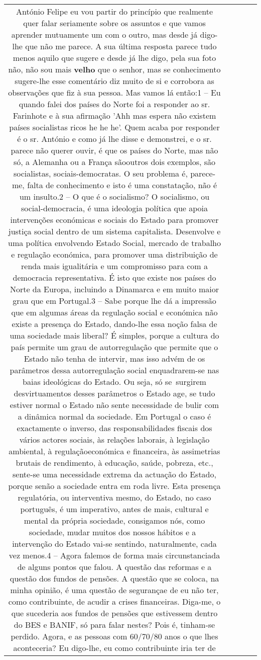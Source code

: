 \documentclass[11pt]{article}
\newlength\mylength
\begin{document}
\begin{center}
\begin{longtable}{|C{.65\mylength}|C{.30\mylength}|C{.12\mylength}|C{.12\mylength}|C{.12\mylength}|}
  \small António Felipe eu vou partir do princípio que realmente quer falar seriamente sobre os assuntos e que vamos aprender mutuamente um com o outro, mas desde já digo-lhe que não me parece. A sua última resposta parece tudo menos aquilo que sugere e desde já lhe digo, pela sua foto não, não sou mais \textbf{velho} que o senhor, mas se conhecimento sugere-lhe esse comentário diz muito de si e corrobora as observações que fiz à sua pessoa. Mas vamos lá então:1 – Eu quando falei dos países do Norte foi a responder ao sr. Farinhote e à sua afirmação 'Ahh mas espera não existem países socialistas ricos he he he'. Quem acaba por responder é o sr. António e como já lhe disse e demonstrei, e o sr. parece não querer ouvir, é que os países do Norte, mas não só, a Alemanha ou a França sãooutros dois exemplos, são socialistas, sociais-democratas. O seu problema é, parece-me, falta de conhecimento e isto é uma constatação, não é um insulto.2 – O que é o socialismo? O socialismo, ou social-democracia, é uma ideologia política que apoia intervenções económicas e sociais do Estado para promover justiça social dentro de um sistema capitalista. Desenvolve e uma política envolvendo Estado Social, mercado de trabalho e regulação económica, para promover uma distribuição de renda mais igualitária e um compromisso para com a democracia representativa. É isto que existe nos países do Norte da Europa, incluindo a Dinamarca e em muito maior grau que em Portugal.3 – Sabe porque lhe dá a impressão que em algumas áreas da regulação social e económica não existe a presença do Estado, dando-lhe essa noção falsa de uma sociedade mais liberal? É simples, porque a cultura do país permite um grau de autorregulação que permite que o Estado não tenha de intervir, mas isso advém de os parâmetros dessa autorregulação social enquadrarem-se nas baias ideológicas do Estado. Ou seja, só se surgirem desvirtuamentos desses parâmetros o Estado age, se tudo estiver normal o Estado não sente necessidade de bulir com a dinâmica normal da sociedade. Em Portugal o caso é exactamente o inverso, das responsabilidades fiscais dos vários actores sociais, às relações laborais, à legislação ambiental, à regulaçãoeconómica e financeira, às assimetrias brutais de rendimento, à educação, saúde, pobreza, etc., sente-se uma necessidade extrema da actuação do Estado, porque senão a sociedade entra em roda livre. Esta presença regulatória, ou interventiva mesmo, do Estado, no caso português, é um imperativo, antes de mais, cultural e mental da própria sociedade, consigamos nós, como sociedade, mudar muitos dos nossos hábitos e a  intervenção do Estado vai-se sentindo, naturalmente, cada vez menos.4 – Agora falemos de forma mais circunstanciada de alguns pontos que falou. A questão das reformas e a questão dos fundos de pensões. A questão que se coloca, na minha opinião, é uma questão de segurançae de eu não ter, como contribuinte, de acudir a crises financeiras. Diga-me, o que sucederia aos fundos de pensões que estivessem dentro do BES e BANIF, só para falar nestes? Pois é, tinham-se perdido. Agora, e as pessoas com 60/70/80 anos o que lhes aconteceria? Eu digo-lhe, eu como contribuinte iria ter de 
\end{longtable}
\end{center}
\end{document}
